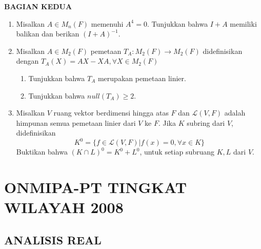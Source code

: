 \documentclass[12pt,twoside]{article}
\begin{document}
\newpage \textbf{BAGIAN KEDUA}
\begin{enumerate}
	\item Misalkan $A\in M_n(F)$ memenuhi $A^4=0$. Tunjukkan bahwa $I+A$ memiliki balikan dan berikan $(I+A)^{-1}$.

	\item Misalkan $A\in M_2(F)$ pemetaan $T_A: M_2(F)\to M_2(F)$ didefinisikan dengan $T_A(X)=AX-XA, \forall X\in M_2(F)$
	      \begin{enumerate}
		      \item Tunjukkan bahwa $T_A$ merupakan pemetaan linier.
		      \item Tunjukkan bahwa $null(T_A)\geq 2$.
	      \end{enumerate}
	\item Misalkan $V$ ruang vektor berdimensi hingga atas $F$ dan $\mathcal{L}(V,F)$ adalah himpunan semua pemetaan linier dari $V$ ke $F$. 	Jika $K$ subring dari $V$, didefinisikan
	      $$K^{0}=\{f\in \mathcal{L}(V,F)|f(x)=0,\forall x\in K\}$$
	      Buktikan bahwa $(K\cap L)^{0}=K^{0}+L^{0}$, untuk setiap subruang  $K,L$ dari $V$.
\end{enumerate}



\newpage
\section{ONMIPA-PT TINGKAT WILAYAH 2008}
\subsection{ANALISIS REAL}
\end{document}
